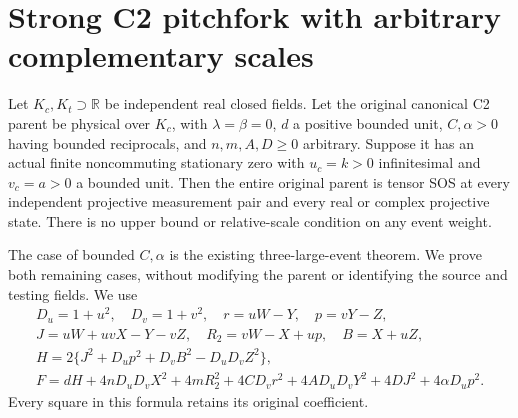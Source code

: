 \section[Strong C2 pitchfork with arbitrary complementary scales]{Strong C2 pitchfork with arbitrary complementary scales}
\label{sec:strong-complement-pitchfork}

\begin{theorem}
\label{thm:strong-complement-pitchfork}
Let $K_c,K_t\supset\mathbb R$ be independent real closed fields.
Let the original canonical C2 parent be physical over $K_c$, with
$\lambda=\beta=0$, $d$ a positive bounded unit, $C,\alpha>0$
having bounded reciprocals, and $n,m,A,D\geq0$ arbitrary.
Suppose it has an actual finite noncommuting stationary zero with
$u_c=k>0$ infinitesimal and $v_c=a>0$ a bounded unit.
Then the entire original parent is tensor SOS at every independent
projective measurement pair and every real or complex projective state.
There is no upper bound or relative-scale condition on any event weight.
\end{theorem}

The case of bounded $C,\alpha$ is the existing three-large-event
theorem. We prove both remaining cases, without modifying the parent
or identifying the source and testing fields. We use
\[
\begin{gathered}
 D_u=1+u^2,\quad D_v=1+v^2,\quad r=uW-Y,\quad p=vY-Z,\\
 J=uW+uvX-Y-vZ,\quad R_2=vW-X+up,\quad B=X+uZ,\\
 H=2\{J^2+D_up^2+D_vB^2-D_uD_vZ^2\},\\
 F=dH+4nD_uD_vX^2+4mR_2^2+4CD_vr^2
       +4AD_uD_vY^2+4DJ^2+4\alpha D_up^2.              \tag{SC1}
\end{gathered}
\]
Every square in this formula retains its original coefficient.


